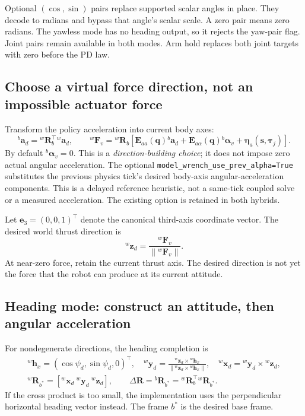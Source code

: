 \documentclass[11pt,a4paper]{article}
\newcommand{\vct}[1]{\boldsymbol{#1}}
\newcommand{\mat}[1]{\mathbf{#1}}
\newcommand{\bv}[1]{{}^{b}\vct{#1}}
\newcommand{\wv}[1]{{}^{w}\vct{#1}}
\newcommand{\Rw}{{}^{w}\mat R_b}
\newcommand{\e}{\vct e_3}
\begin{document}
Optional $(\cos,\sin)$ pairs replace supported scalar angles in place. They
decode to radians and bypass that angle's scalar scale. A zero pair means zero
radians. The yawless mode has no heading output, so it rejects the yaw-pair flag.
Joint pairs remain available in both modes. Arm hold replaces both joint targets
with zero before the PD law.

\subsection{Choose a virtual force direction, not an impossible actuator force}
Transform the policy acceleration into current body axes:
\begin{equation}
\bv a_d=\Rw^\top\wv a_d,\qquad
\wv F_v=\Rw\left[
\mat E_{aa}(\vct q)\bv a_d+
\mat E_{a\alpha}(\vct q)\bv\alpha_v+
\vct\eta_a(\vct s,\vct\tau_j)\right].
\label{eq:virtualforce}
\end{equation}
By default $\bv\alpha_v=0$. This is a \emph{direction-building choice}; it does
not impose zero actual angular acceleration. The optional
\texttt{model\_wrench\_use\_prev\_alpha=True} substitutes the previous physics
tick's desired body-axis angular-acceleration components. This is a delayed
reference heuristic, not a same-tick coupled solve or a measured acceleration.
The existing option is retained in both hybrids.

Let $\e=(0,0,1)^\top$ denote the canonical third-axis coordinate vector. The
desired world thrust direction is
\begin{equation}
\wv z_d=\frac{\wv F_v}{\|\wv F_v\|}.
\label{eq:direction}
\end{equation}
At near-zero force, retain the current thrust axis. The desired direction is
not yet the force that the robot can produce at its current attitude.

\subsection{Heading mode: construct an attitude, then angular acceleration}
For nondegenerate directions, the heading completion is
\begin{equation}
\begin{gathered}
\wv h_x=(\cos\psi_d,\sin\psi_d,0)^\top,\quad
\wv y_d=\frac{\wv z_d\times\wv h_x}{\|\wv z_d\times\wv h_x\|},\quad
\wv x_d=\wv y_d\times\wv z_d,\\
{}^w\mat R_{b^*}=[\wv x_d\ \wv y_d\ \wv z_d],\qquad
\Delta\mat R={}^b\mat R_{b^*}=\Rw^\top{}^w\mat R_{b^*}.
\end{gathered}\label{eq:heading}
\end{equation}
If the cross product is too small, the implementation uses the perpendicular
horizontal heading vector instead. The frame $b^*$ is the desired base frame.
\end{document}
